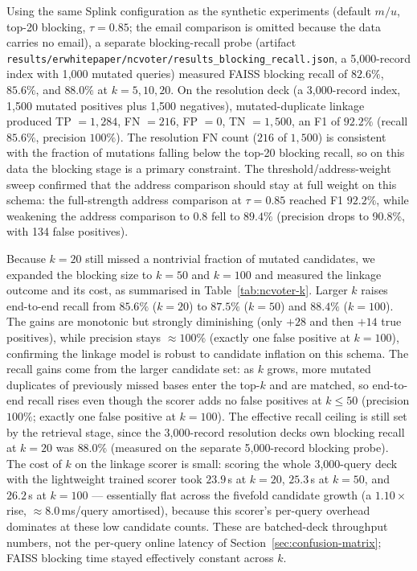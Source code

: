 \documentclass[11pt]{article}
\begin{document}
Using the same Splink configuration as the synthetic experiments (default $m/u$, top-20 blocking, $\tau=0.85$; the email comparison is omitted because the data carries no email), a separate blocking-recall probe (artifact \texttt{results/erwhitepaper/ncvoter/results\_blocking\_recall.json}, a 5{,}000-record index with 1{,}000 mutated queries) measured FAISS blocking recall of $82.6\%$, $85.6\%$, and $88.0\%$ at $k=5,10,20$. On the resolution deck (a 3{,}000-record index, 1{,}500 mutated positives plus 1{,}500 negatives), mutated-duplicate linkage produced TP $=1{,}284$, FN $=216$, FP $=0$, TN $=1{,}500$, an F1 of $92.2\%$ (recall $85.6\%$, precision $100\%$). The resolution FN count ($216$ of $1{,}500$) is consistent with the fraction of mutations falling below the top-20 blocking recall, so on this data the blocking stage is a primary constraint. The threshold/address-weight sweep confirmed that the address comparison should stay at full weight on this schema: the full-strength address comparison at $\tau=0.85$ reached F1 $92.2\%$, while weakening the address comparison to 0.8 fell to $89.4\%$ (precision drops to 90.8\%, with 134 false positives).

Because $k=20$ still missed a nontrivial fraction of mutated candidates, we expanded the blocking size to $k=50$ and $k=100$ and measured the linkage outcome and its cost, as summarised in Table~\ref{tab:ncvoter-k}. Larger $k$ raises end-to-end recall from $85.6\%$ ($k=20$) to $87.5\%$ ($k=50$) and $88.4\%$ ($k=100$). The gains are monotonic but strongly diminishing (only $+28$ and then $+14$ true positives), while precision stays $\approx 100\%$ (exactly one false positive at $k=100$), confirming the linkage model is robust to candidate inflation on this schema. The recall gains come from the larger candidate set: as $k$ grows, more mutated duplicates of previously missed bases enter the top-$k$ and are matched, so end-to-end recall rises even though the scorer adds no false positives at $k\leq 50$ (precision $100\%$; exactly one false positive at $k=100$). The effective recall ceiling is still set by the retrieval stage, since the 3{,}000-record resolution deck\textquotesingle{}s own blocking recall at $k=20$ was $88.0\%$ (measured on the separate 5{,}000-record blocking probe). The cost of $k$ on the linkage scorer is small: scoring the whole 3{,}000-query deck with the lightweight trained scorer took $23.9$\,s at $k=20$, $25.3$\,s at $k=50$, and $26.2$\,s at $k=100$ --- essentially flat across the fivefold candidate growth (a $1.10\times$ rise, $\approx 8.0$\,ms/query amortised), because this scorer's per-query overhead dominates at these low candidate counts. These are batched-deck throughput numbers, not the per-query online latency of Section~\ref{sec:confusion-matrix}; FAISS blocking time stayed effectively constant across $k$.
\end{document}
